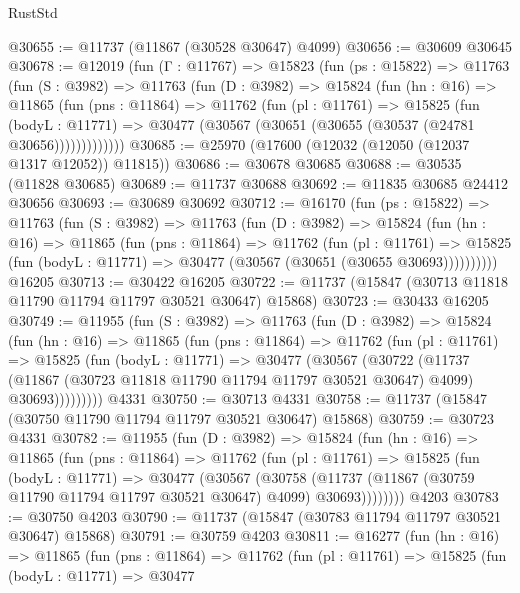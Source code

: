 \begin{lexlean}{RustStd}
\begin{coremodule}
@30655 := @11737 (@11867 (@30528 @30647) @4099)
@30656 := @30609 @30645
@30678 := @12019
    (fun (Γ : @11767) =>
    @15823
      (fun (ps : @15822) =>
      @11763
        (fun (S : @3982) =>
        @11763
          (fun (D : @3982) =>
          @15824
            (fun (hn : @16) =>
            @11865
              (fun (pns : @11864) =>
              @11762
                (fun (pl : @11761) =>
                @15825
                  (fun (bodyL : @11771) =>
                  @30477 (@30567 (@30651 (@30655 (@30537 (@24781 @30656)))))))))))))
@30685 := @25970 (@17600 (@12032 (@12050 (@12037 @1317 @12052)) @11815))
@30686 := @30678 @30685
@30688 := @30535 (@11828 @30685)
@30689 := @11737 @30688
@30692 := @11835 @30685 @24412 @30656
@30693 := @30689 @30692
@30712 := @16170
    (fun (ps : @15822) =>
    @11763
      (fun (S : @3982) =>
      @11763
        (fun (D : @3982) =>
        @15824
          (fun (hn : @16) =>
          @11865
            (fun (pns : @11864) =>
            @11762
              (fun (pl : @11761) =>
              @15825 (fun (bodyL : @11771) => @30477 (@30567 (@30651 (@30655 @30693))))))))))
    @16205
@30713 := @30422 @16205
@30722 := @11737 (@15847 (@30713 @11818 @11790 @11794 @11797 @30521 @30647) @15868)
@30723 := @30433 @16205
@30749 := @11955
    (fun (S : @3982) =>
    @11763
      (fun (D : @3982) =>
      @15824
        (fun (hn : @16) =>
        @11865
          (fun (pns : @11864) =>
          @11762
            (fun (pl : @11761) =>
            @15825
              (fun (bodyL : @11771) =>
              @30477
                (@30567
                  (@30722
                    (@11737
                      (@11867 (@30723 @11818 @11790 @11794 @11797 @30521 @30647) @4099)
                      @30693)))))))))
    @4331
@30750 := @30713 @4331
@30758 := @11737 (@15847 (@30750 @11790 @11794 @11797 @30521 @30647) @15868)
@30759 := @30723 @4331
@30782 := @11955
    (fun (D : @3982) =>
    @15824
      (fun (hn : @16) =>
      @11865
        (fun (pns : @11864) =>
        @11762
          (fun (pl : @11761) =>
          @15825
            (fun (bodyL : @11771) =>
            @30477
              (@30567
                (@30758
                  (@11737 (@11867 (@30759 @11790 @11794 @11797 @30521 @30647) @4099) @30693))))))))
    @4203
@30783 := @30750 @4203
@30790 := @11737 (@15847 (@30783 @11794 @11797 @30521 @30647) @15868)
@30791 := @30759 @4203
@30811 := @16277
    (fun (hn : @16) =>
    @11865
      (fun (pns : @11864) =>
      @11762
        (fun (pl : @11761) =>
        @15825
          (fun (bodyL : @11771) =>
          @30477

\end{coremodule}
\end{lexlean}

